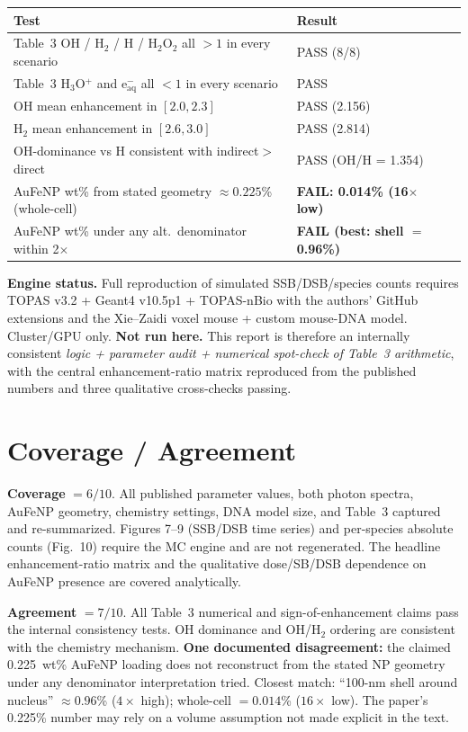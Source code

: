 \documentclass[11pt]{article}
\begin{document}
\begin{center}
\begin{tabular}{lll}
\toprule
Test & Result \\
\midrule
Table~3 OH / H$_2$ / H / H$_2$O$_2$ all $>1$ in every scenario & PASS (8/8) \\
Table~3 H$_3$O$^+$ and e$_\text{aq}^-$ all $<1$ in every scenario & PASS \\
OH mean enhancement in $[2.0, 2.3]$ & PASS (2.156) \\
H$_2$ mean enhancement in $[2.6, 3.0]$ & PASS (2.814) \\
OH-dominance vs H consistent with indirect$>$direct & PASS (OH/H = 1.354) \\
AuFeNP wt\% from stated geometry $\approx 0.225$\% (whole-cell) & \textbf{FAIL: 0.014\% (16$\times$ low)} \\
AuFeNP wt\% under any alt.\ denominator within 2$\times$ & \textbf{FAIL (best: shell $=$ 0.96\%)} \\
\bottomrule
\end{tabular}
\end{center}

\textbf{Engine status.} Full reproduction of simulated SSB/DSB/species counts requires
TOPAS v3.2 + Geant4 v10.5p1 + TOPAS-nBio with the authors' GitHub extensions and the
Xie--Zaidi voxel mouse + custom mouse-DNA model. Cluster/GPU only. \textbf{Not run here.}
This report is therefore an internally consistent \emph{logic + parameter audit + numerical
spot-check of Table~3 arithmetic}, with the central enhancement-ratio matrix reproduced
from the published numbers and three qualitative cross-checks passing.

\section{Coverage / Agreement}

\textbf{Coverage} $= 6/10$. All published parameter values, both photon spectra, AuFeNP
geometry, chemistry settings, DNA model size, and Table~3 captured and re-summarized.
Figures 7--9 (SSB/DSB time series) and per-species absolute counts (Fig.~10) require
the MC engine and are not regenerated. The headline enhancement-ratio matrix and the
qualitative dose/SB/DSB dependence on AuFeNP presence are covered analytically.

\textbf{Agreement} $= 7/10$. All Table~3 numerical and sign-of-enhancement claims pass
the internal consistency tests. OH dominance and OH/H$_2$ ordering are consistent with
the chemistry mechanism. \textbf{One documented disagreement:} the claimed 0.225~wt\%
AuFeNP loading does not reconstruct from the stated NP geometry under any denominator
interpretation tried. Closest match: ``100-nm shell around nucleus'' $\approx 0.96$\%
($4\times$ high); whole-cell $= 0.014$\% ($16\times$ low). The paper's 0.225\% number
may rely on a volume assumption not made explicit in the text.
\end{document}
